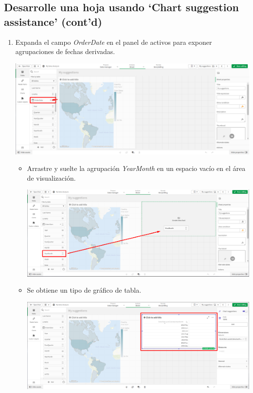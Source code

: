 \documentclass[12pt,letterpaper]{article}
\newcommand\tab[1][1cm]{\hspace*{#1}}
\begin{document}
    \subsection{Desarrolle una hoja usando ‘Chart suggestion assistance’ (cont’d)}
    \begin{enumerate}[\tab 1.]
        \item Expanda el campo \textit{OrderDate} en el panel de activos para exponer agrupaciones de fechas derivadas.
        \begin{center}
            \includegraphics[width=13cm]{./img/img19.png}
        \end{center}
        \begin{itemize}
            \item Arrastre y suelte la agrupación \textit{YearMonth} en un espacio vacío en el área de visualización.
            \begin{center}
                \includegraphics[width=13cm]{./img/img19.1.png}
            \end{center}
            \item Se obtiene un tipo de gráfico de tabla.
            \begin{center}
                \includegraphics[width=13cm]{./img/img19.2.png}

\end{center}
\end{itemize}
\end{enumerate}
\end{document}
